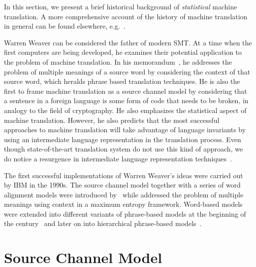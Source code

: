 In this section, we present a brief historical background of \emph{statistical}
machine translation. A more comprehensive account of the history
of machine translation in general can be found
elsewhere, e.g.~\citep{hutchins:1997:MT,hutchins:2000:MT}.

Warren Weaver can be considered the father of modern SMT.
At a time when the first computers are being developed, he
examines their potential application to the problem of machine
translation. In his memorandum~\citep{weaver:1955:Translation}, he
addresses the problem of multiple meanings of a source word
by considering the context of that source word, which heralds
phrase based translation techniques. He is also
the first to frame machine translation as a source channel
model by considering that a sentence in a foreign language
is some form of code that needs to be broken, in analogy
to the field of cryptography. He also emphasizes the
statistical aspect of machine translation. However, he also
predicts that the most successful approaches to machine
translation will take advantage of language invariants by
using an intermediate language representation in the translation
process. Even though state-of-the-art translation system do not
use this kind of approach, we do notice a resurgence in intermediate
language representation techniques~\citep{mikolov-le-sutskever:2013:arxiv}.

The first successful implementations of Warren Weaver's ideas
were carried out by IBM in the 1990s. The source channel
model together with a series of word alignment models were introduced
by~\citet{brown-dellapietra-dellapietra-mercer-1993} while
\citet{berger-dellapietra-dellapietra:1996:CL} addressed the problem
of multiple meanings using context in a maximum entropy framework.
Word-based models were extended into different variants
of phrase-based models at the
beginning of the century~\citep{koehn-och-marcu:2003:NAACL,och-ney:2004:CL}
and later on into hierarchical phrase-based models~\citep{chiang:2007:CL}.

\section{Source Channel Model}
\label{sec:sourceChannelModel}



